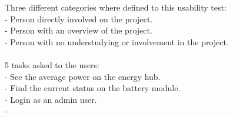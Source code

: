 Three different categories where defined to this usability test:\\
- Person directly involved on the project.\\
- Person with an overview of the project.\\
- Person with no understudying or involvement in the project.\\
\\

5 tasks asked to the users:\\
- See the average power on the energy hub.\\
- Find the current status on the battery module.\\
- Login as an admin user.\\
- 













